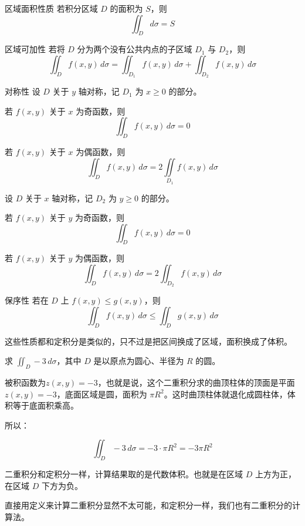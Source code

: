 \begin{theorem}{区域面积性质}{}
  若积分区域 \(D\) 的面积为 \(S\)，则
\[\iint_{D} d\sigma = S\]
\end{theorem}

\begin{theorem}{区域可加性}{}
若将 \(D\) 分为两个没有公共内点的子区域 \(D_1\) 与 \(D_2\)，则
\[\iint_{D} f(x,y)\,d\sigma = \iint_{D_1} f(x,y)\,d\sigma + \iint_{D_2} f(x,y)\,d\sigma\]
\end{theorem}

\begin{theorem}{对称性}{}
设 \(D\) 关于 \(y\) 轴对称，记 \(D_1\) 为 \(x \geq 0\) 的部分。

若 \(f(x,y)\) 关于 \(x\) 为奇函数，则
\[\iint_{D} f(x,y)\,d\sigma = 0\]

若 \(f(x,y)\) 关于 \(x\) 为偶函数，则
\[\iint_{D} f(x,y)\,d\sigma = 2 \iint\limits_{D_1} f(x,y)\,d\sigma\]

设 \(D\) 关于 \(x\) 轴对称，记 \(D_2\) 为 \(y \geq 0\) 的部分。

若 \(f(x,y)\) 关于 \(y\) 为奇函数，则
\[\iint_{D} f(x,y)\,d\sigma = 0\]

若 \(f(x,y)\) 关于 \(y\) 为偶函数，则
\[\iint_{D} f(x,y)\,d\sigma = 2 \iint_{D_2} f(x,y)\,d\sigma\]
\end{theorem}

\begin{theorem}{保序性}{}
若在 \(D\) 上 \(f(x,y) \leq g(x,y)\)，则
\[\iint_{D} f(x,y)\,d\sigma \leq \iint_{D} g(x,y)\,d\sigma\]
\end{theorem}

这些性质都和定积分是类似的，只不过是把区间换成了区域，面积换成了体积。

\begin{myexample}
  求 $\iint_D -3\, d\sigma$，其中 $D$ 是以原点为圆心、半径为 $R$ 的圆。

  被积函数为$z(x,y)=-3$，也就是说，这个二重积分求的曲顶柱体的顶面是平面$z(x,y)=-3$，底面区域是圆，面积为 $\pi R^2$。这时曲顶柱体就退化成圆柱体，体积等于底面积乘高。

  所以：

  \[
  \iint_D -3\, d\sigma=-3 \cdot \pi R^2=-3\pi R^2
  \]
\end{myexample}

二重积分和定积分一样，计算结果取的是代数体积。也就是在区域 $D$ 上方为正，在区域 $D$ 下方为负。

直接用定义来计算二重积分显然不太可能，和定积分一样，我们也有二重积分的计算法。

